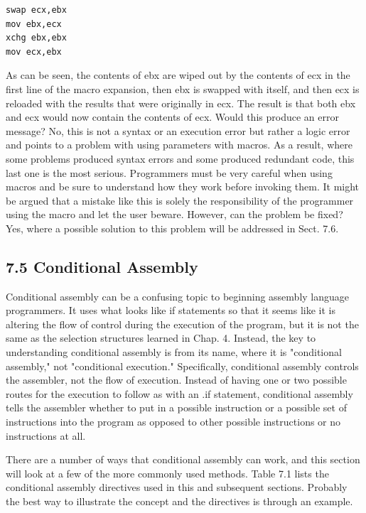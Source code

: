 \documentclass[10pt]{book}
\begin{document}
\begin{verbatim}
swap ecx,ebx
mov ebx,ecx
xchg ebx,ebx
mov ecx,ebx
\end{verbatim}

As can be seen, the contents of ebx are wiped out by the contents of ecx in the first line of the macro expansion, then ebx is swapped with itself, and then ecx is reloaded with the results that were originally in ecx. The result is that both ebx and ecx would now contain the contents of ecx. Would this produce an error message? No, this is not a syntax or an execution error but rather a logic error and points to a problem with using parameters with macros. As a result, where some problems produced syntax errors and some produced redundant code, this last one is the most serious. Programmers must be very careful when using macros and be sure to understand how they work before invoking them. It might be argued that a mistake like this is solely the responsibility of the programmer using the macro and let the user beware. However, can the problem be fixed? Yes, where a possible solution to this problem will be addressed in Sect. 7.6.


\subsection*{7.5 Conditional Assembly}
Conditional assembly can be a confusing topic to beginning assembly language programmers. It uses what looks like if statements so that it seems like it is altering the flow of control during the execution of the program, but it is not the same as the selection structures learned in Chap. 4. Instead, the key to understanding conditional assembly is from its name, where it is "conditional assembly," not "conditional execution." Specifically, conditional assembly controls the assembler, not the flow of execution. Instead of having one or two possible routes for the execution to follow as with an .if statement, conditional assembly tells the assembler whether to put in a possible instruction or a possible set of instructions into the program as opposed to other possible instructions or no instructions at all.

There are a number of ways that conditional assembly can work, and this section will look at a few of the more commonly used methods. Table 7.1 lists the conditional assembly directives used in this and subsequent sections. Probably the best way to illustrate the concept and the directives is through an example.
\end{document}
